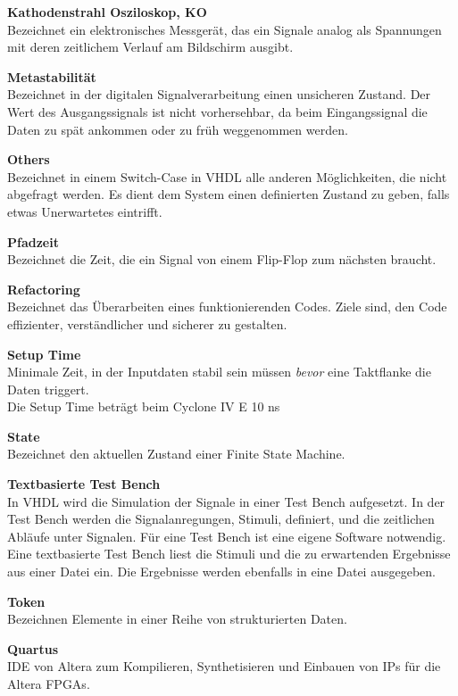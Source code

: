\textbf{Kathodenstrahl Osziloskop, KO}\\
Bezeichnet ein elektronisches Messgerät, das ein Signale analog als Spannungen mit deren zeitlichem Verlauf am Bildschirm ausgibt.

\textbf{Metastabilität}\\
Bezeichnet in der  digitalen Signalverarbeitung einen unsicheren Zustand. Der Wert des Ausgangssignals ist nicht vorhersehbar, da beim Eingangssignal die Daten zu spät ankommen oder zu früh weggenommen werden.

\textbf{Others}\\
Bezeichnet in einem Switch-Case in VHDL alle anderen Möglichkeiten, die nicht abgefragt werden. Es dient dem System einen definierten Zustand zu geben, falls etwas Unerwartetes eintrifft.

\textbf{Pfadzeit}\\
Bezeichnet die Zeit, die ein Signal von einem Flip-Flop zum nächsten braucht.

\textbf{Refactoring}\\
Bezeichnet das Überarbeiten eines funktionierenden Codes. Ziele sind, den Code effizienter, verständlicher und sicherer zu gestalten.

\textbf{Setup Time} \\
Minimale Zeit, in der Inputdaten stabil sein müssen \textit{bevor} eine Taktflanke die Daten triggert.\\
Die Setup Time beträgt beim Cyclone IV E 10 ns \citep{Handbook_Altera}

\textbf{State}\\
Bezeichnet den aktuellen Zustand einer Finite State Machine.

\textbf{Textbasierte Test Bench}\\
In VHDL wird die Simulation der Signale in einer Test Bench aufgesetzt. In der Test Bench werden die Signalanregungen, Stimuli, definiert, und die zeitlichen Abläufe unter Signalen. Für eine Test Bench ist eine eigene Software notwendig.\\
Eine textbasierte Test Bench liest die Stimuli und die zu erwartenden Ergebnisse aus einer Datei ein. Die Ergebnisse werden ebenfalls in eine Datei ausgegeben.

\textbf{Token}\\
Bezeichnen Elemente in einer Reihe von strukturierten Daten.

\textbf{Quartus}\\
IDE von Altera zum Kompilieren, Synthetisieren und Einbauen von IPs für die Altera FPGAs.
